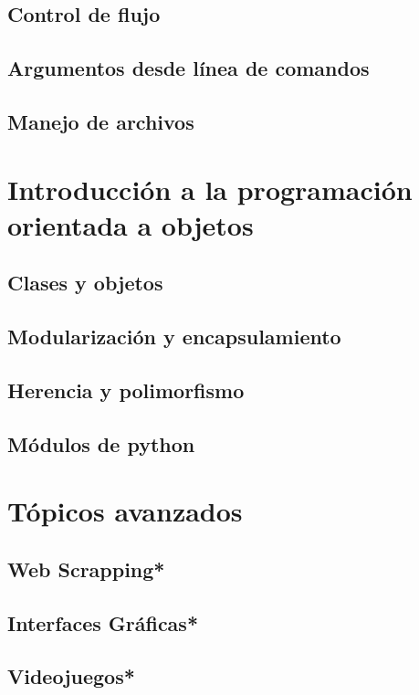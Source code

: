 \documentclass[10pt]{beamer}
\begin{document}
\subsection{Control de flujo}
\subsection{Argumentos desde línea de comandos}
\subsection{Manejo de archivos}

\section{Introducción a la programación orientada a objetos}
\subsection{Clases y objetos}
\subsection{Modularización y encapsulamiento}
\subsection{Herencia y polimorfismo}
\subsection{Módulos de python}


\section{Tópicos avanzados}
\subsection{Web Scrapping*}
\subsection{Interfaces Gráficas*}
\subsection{Videojuegos*}
\end{document}
